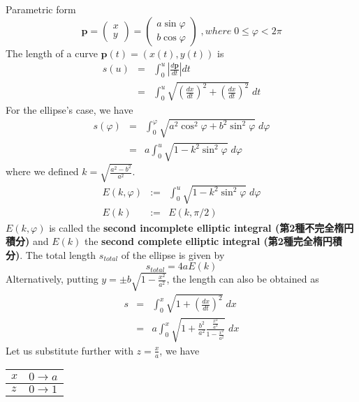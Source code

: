 \documentclass{article}
\begin{document}
Parametric form
\begin{equation}
\mathbf{p} =\left(
\begin{array}{c}
 x \\
 y
\end{array} \right)
=\left(
\begin{array}{c}
 a \sin{\varphi} \\
 b \cos{\varphi}
\end{array} \right)
\;, where \; 0 \le \varphi < 2 \pi
\end{equation}
The length of a curve $\mathbf{p}(t) = (x(t), y(t))$ is
\begin{eqnarray}
s(u) &=& \int_{0}^{u} \left| \frac{d \mathbf{p}}{d t} \right| dt  \\ \nonumber
     &=& \int_{0}^{u} \sqrt{ \left( \frac{d x}{d t} \right)^{2} +  \left( \frac{d x}{d t} \right)^{2} } \; dt
\end{eqnarray}
For the ellipse's case, we have
\begin{eqnarray}
s(\varphi) &=& \int_{0}^{\varphi} \sqrt{ a^{2} \cos^{2}{\varphi} +  b^{2}  \sin^{2}{\varphi}} \; d\varphi \\ \nonumber
     &=& a \int_{0}^{u} \sqrt{ 1 -  k^{2}  \sin^{2}{\varphi}} \; d\varphi 
\end{eqnarray}
where we defined $k = \sqrt{\frac{a^2 - b^2}{a^2}}$.
\begin{eqnarray}
E(k, \varphi ) &:=& \int_{0}^{u} \sqrt{ 1 -  k^{2}  \sin^{2}{\varphi}} \; d\varphi \\
E(k) &:=& E(k,  \pi/2 )
\end{eqnarray}
$E(k, \varphi )$ is called the \textbf{second incomplete elliptic integral (第2種不完全楕円積分)} and $E(k)$ the \textbf{second complete elliptic integral (第2種完全楕円積分)}. The total length $s_{total}$ of the ellipse is given by 
\begin{equation}
s_{total} = 4a E(k) 
\end{equation}
Alternatively, putting $y = \pm b \sqrt{1 - \frac{x^{2}}{a^{2}}}$, the length can also be obtained as
\begin{eqnarray}
s &=& \int_{0}^{x} \sqrt{ 1  +  \left( \frac{d x}{d t} \right)^{2} } \; dx \\ \nonumber
     &=& a \int_{0}^{x} \sqrt{ 1  +   \frac{b^{2}}{a^{2}} \frac{\frac{x^{2}}{a^{2}}}{1 - \frac{x^{2}}{a^{2}}} } \; dx
\end{eqnarray}
Let us substitute further with $z = \frac{x}{a}$, we have
\begin{center}
\begin{tabular}{ll}
$x$ & $0 \rightarrow a$\\
\hline
$z$ & $0 \rightarrow 1$\\
\end{tabular}
\end{center}
\end{document}
